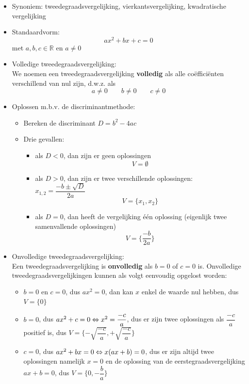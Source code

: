 \documentclass[12pt]{article}
\begin{document}
\begin{itemize}
\item Synoniem: tweedegraadsvergelijking, vierkantsvergelijking, kwadratische vergelijking
\item Standaardvorm:
  $$ax^2 + bx + c = 0$$
  met $a, b, c \in \mathbb{R}$ en $a\neq 0$
\item Volledige tweedegraadsvergelijking:\\
  We noemen een tweedegraadsvergelijking {\bf volledig} als alle coëfficiënten verschillend van nul zijn, d.w.z. als
  $$ a\neq 0 \qquad b\neq 0 \qquad c\neq 0$$
\item Oplossen m.b.v. de discriminantmethode:
  \begin{itemize}
  \item Bereken de discriminant $D=b^2-4ac$
  \item Drie gevallen:
    \begin{itemize}
    \item als $D<0$, dan zijn er geen oplossingen
      $$V=\emptyset$$
    \item als $D>0$, dan zijn er twee verschillende oplossingen: $x_{1,2}=\dfrac{-b\pm\sqrt{D}}{2a}$
      $$V=\{x_1, x_2\}$$
    \item als $D=0$, dan heeft de vergelijking één oplossing (eigenlijk twee samenvallende oplossingen)
      $$V=\{\dfrac{-b}{2a}\}$$
    \end{itemize}
  \end{itemize}
\item Onvolledige tweedegraadsvergelijking:\\
  Een tweedegraadsvergelijking is {\bf onvolledig} als $b=0$ of $c=0$ is. Onvolledige tweedegraadsvergelijkingen kunnen als volgt eenvoudig opgelost worden:
  \begin{itemize}
    \item $b=0$ en $c=0$, dus $ax^2=0$, dan kan $x$ enkel de waarde nul hebben, dus $V=\{0\}$
    \item $b=0$, dus $ax^2+c=0\Leftrightarrow x^2=\dfrac{-c}{a}$, dus er zijn twee oplossingen als $\dfrac{-c}{a}$ positief is, dus $V=\{-\sqrt{\dfrac{-c}{a}}, +\sqrt{\dfrac{-c}{a}}\}$
    \item $c=0$, dus $ax^2+bx=0\Leftrightarrow x(ax+b)=0$, dus er zijn altijd twee oplossingen namelijk $x=0$ en de oplossing van de eerstegraadsvergelijking $ax+b=0$, dus $V=\{0, -\dfrac{b}{a}\}$
  \end{itemize}
\end{itemize}
\end{document}
